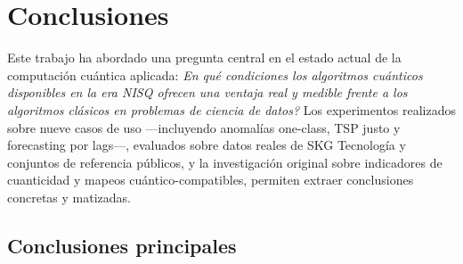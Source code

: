 \chapter{Conclusiones}

Este trabajo ha abordado una pregunta central en el estado actual de la computación cuántica aplicada: \textit{\textquestiondown{}En qué condiciones los algoritmos cuánticos disponibles en la era NISQ ofrecen una ventaja real y medible frente a los algoritmos clásicos en problemas de ciencia de datos?} Los experimentos realizados sobre nueve casos de uso ---incluyendo anomalías one-class, TSP justo y forecasting por lags---, evaluados sobre datos reales de SKG Tecnología y conjuntos de referencia públicos, y la investigación original sobre indicadores de cuanticidad y mapeos cuántico-compatibles, permiten extraer conclusiones concretas y matizadas.

\section{Conclusiones principales}

